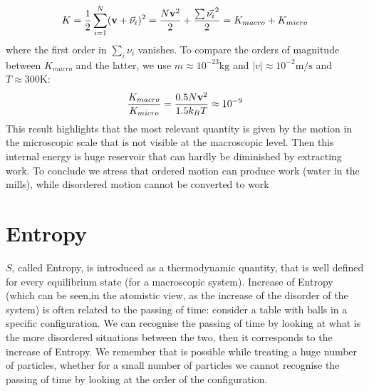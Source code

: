 \documentclass{article}
\begin{document}
$$ K = \frac{1}{2} \sum_{i=1}^N (\v_v +\Vec{\nu}_i)^2 = \frac{N\v_v^2}{2} + \frac{\sum\Vec{\nu_i}^2}{2} =  K_{macro}+K_{micro}$$
where the first order in $\sum_i\nu_i$ vanishes. To compare the orders of magnitude between $K_{macro}$ and the latter, we use $m \approx 10^{-23} \mathrm{kg}$ and $|v| \approx 10^{-2} \mathrm{m/s}$ and $T \approx 300 \mathrm{K}$:
$$ \frac{K_{macro}}{K_{micro}} = \frac{0.5N\v_v^2}{1.5 k_B T} \approx 10^{-9} $$
This result highlights that the most relevant quantity is given by the motion in the microscopic scale that is not visible at the macroscopic level. Then this internal energy is huge reservoir that can hardly be diminished by extracting work. To conclude we stress that ordered motion can produce work (water in the mills), while disordered motion cannot be converted to work

\section{Entropy}
$S$, called Entropy, is introduced as a thermodynamic quantity, that is well defined for every equilibrium state (for a macroscopic system). Increase of Entropy (which can be seen,in the atomistic view, as the increase of the disorder of the system) is often related to the passing of time: consider a table with balls in a specific configuration. We can recognise the passing of time by looking at what is the more disordered situations between the two, then it corresponds to the increase of Entropy. We remember that is possible while treating a huge number of particles, whether for a small number of particles we cannot recognise the passing of time by looking at the order of the configuration. 
\end{document}
